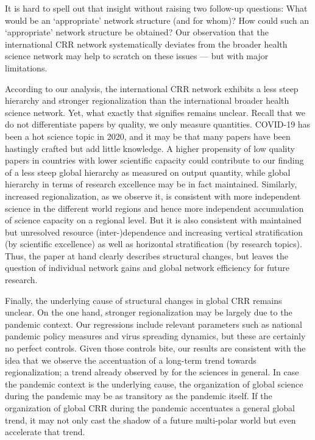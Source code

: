 It is hard to spell out that insight without raising two follow-up questions: What would be an `appropriate' network structure (and for whom)? How could such an `appropriate' network structure be obtained? Our observation that the international CRR network systematically deviates from the broader health science network may help to scratch on these issues --- but with major limitations. 

According to our analysis, the international CRR network exhibits a less steep hierarchy and stronger regionalization than the international broader health science network. Yet, what exactly that signifies remains unclear. Recall that we do not differentiate papers by quality, we only measure quantities. COVID-19 has been a hot science topic in 2020, and it may be that many papers have been hastingly crafted but add little knowledge. A higher propensity of low quality papers in countries with lower scientific capacity could contribute to our finding of a less steep global hierarchy as measured on output quantity, while global hierarchy in terms of research excellence may be in fact maintained. Similarly, increased regionalization, as we observe it, is consistent with more independent science in the different world regions and hence more independent accumulation of science capacity on a regional level. But it is also consistent with maintained but unresolved resource (inter-)dependence and increasing vertical stratification (by scientific excellence) as well as horizontal stratification (by research topics). Thus, the paper at hand clearly describes structural changes, but leaves the question of individual network gains and global network efficiency for future research. 

Finally, the underlying cause of structural changes in global CRR remains unclear. On the one hand, stronger regionalization may be largely due to the pandemic context. Our regressions include relevant parameters such as national pandemic policy measures and virus spreading dynamics, but these are certainly no perfect controls. Given those controls bite, our results are consistent with the idea that we observe the accentuation of a long-term trend towards regionalization; a trend already observed by \citet{fitzgerald2021academia} for the sciences in general. In case the pandemic context is the underlying cause, the organization of global science during the pandemic may be as transitory as the pandemic itself. If the organization of global CRR during the pandemic accentuates a general global trend, it may not only cast the shadow of a future multi-polar world but even accelerate that trend. 




